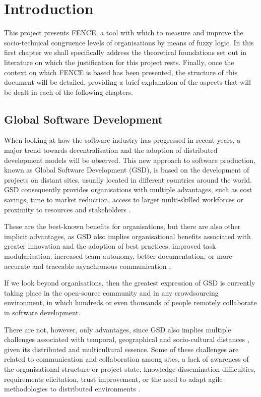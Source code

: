 \chapter{Introduction}
\label{cap:introduction}

This project presents FENCE, a tool with which to measure and improve the socio-technical congruence levels of organisations by means of fuzzy logic. In this first chapter we shall specifically address the theoretical foundations set out in literature on which the justification for this project rests. Finally, once the context on which FENCE is based has been presented, the structure of this document will be detailed, providing a brief explanation of the aspects that will be dealt in each of the following chapters.

\section{Global Software Development}

When looking at how the software industry has progressed in recent years, a major trend towards decentralisation and the adoption of distributed development models will be observed. This new approach to software production, known as Global Software Development (GSD), is based on the development of projects on distant sites, usually located in different countries around the world. GSD consequently provides organisations with multiple advantages, such as cost savings, time to market reduction, access to larger multi-skilled workforces or proximity to resources and stakeholders \cite{conchuir_global_2009, agerfalk_benefits_2008}.

These are the best-known benefits for organisations, but there are also other implicit advantages, as GSD also implies organisational benefits associated with greater innovation and the adoption of best practices, improved task modularisation, increased team autonomy, better documentation, or more accurate and traceable asynchronous communication \cite{agerfalk_benefits_2008}.

If we look beyond organisations, then the greatest expression of GSD is currently taking place in the open-source community \cite{peng_collaborative_2014} and in any crowdsourcing environment, in which hundreds or even thousands of people remotely collaborate in software development.

There are not, however, only advantages, since GSD also implies multiple challenges associated with temporal, geographical and socio-cultural distances \cite{saleem_understanding_2019}, given its distributed and multicultural essence. Some of these challenges are related to communication and collaboration among sites, a lack of awareness of the organisational structure or project state, knowledge dissemination difficulties, requirements elicitation, trust improvement, or the need to adapt agile methodologies to distributed environments \cite{niazi_challenges_2013, shameem_systematic_2018, malik_geographical_2018, manjavacas_global_2020}.


